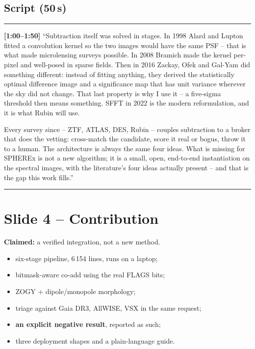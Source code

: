 \documentclass[11pt,a4paper]{article}
\begin{document}
\subsection*{Script (50\,s)}
\noindent\rule{\linewidth}{0.3pt}\par\smallskip\noindent
\textbf{[1:00--1:50]} ``Subtraction itself was solved in stages. In 1998 Alard and Lupton fitted a
convolution kernel so the two images would have the same PSF -- that is what made microlensing surveys
possible. In 2008 Bramich made the kernel per-pixel and well-posed in sparse fields. Then in 2016
Zackay, Ofek and Gal-Yam did something different: instead of fitting anything, they derived the
statistically optimal difference image and a significance map that has unit variance wherever the sky
did not change. That last property is why I use it -- a five-sigma threshold then means something.
SFFT in 2022 is the modern reformulation, and it is what Rubin will use.

Every survey since -- ZTF, ATLAS, DES, Rubin -- couples subtraction to a broker that does the vetting:
cross-match the candidate, score it real or bogus, throw it to a human. The architecture is always the
same four ideas. What is missing for SPHEREx is not a new algorithm; it is a small, open, end-to-end
instantiation on the spectral images, with the literature's four ideas actually present -- and that is
the gap this work fills.''
\par\smallskip\noindent\rule{\linewidth}{0.3pt}

\section{Slide 4 -- Contribution}

\textbf{Claimed:} a verified integration, not a new method.
\begin{itemize}[leftmargin=1.1em,itemsep=3pt]
\item six-stage pipeline, 6\,154 lines, runs on a laptop;
\item bitmask-aware co-add using the real FLAGS bits;
\item ZOGY + dipole/monopole morphology;
\item triage against Gaia DR3, AllWISE, VSX in the same request;
\item \textbf{an explicit negative result}, reported as such;
\item three deployment shapes and a plain-language guide.
\end{itemize}
\end{document}
